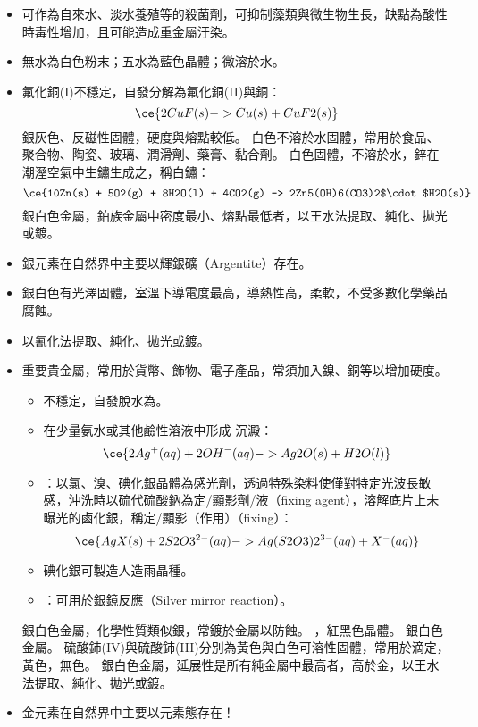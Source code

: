 \documentclass[a4paper,12pt]{report}
\begin{document}
\begin{itemize}
\begin{itemize}
\item 可作為自來水、淡水養殖等的殺菌劑，可抑制藻類與微生物生長，缺點為酸性時毒性增加，且可能造成重金屬汙染。
\eit
{}
\bit
\item 無水為白色粉末；五水為藍色晶體；微溶於水。
\item 氟化銅(I)不穩定，自發分解為氟化銅(II)與銅：
\[\ce{2CuF(s) -> Cu(s) + CuF2(s)}\]
\eit
{}
銀灰色、反磁性固體，硬度與熔點較低。
白色不溶於水固體，常用於食品、聚合物、陶瓷、玻璃、潤滑劑、藥膏、黏合劑。
白色固體，不溶於水，鋅在潮溼空氣中生鏽生成之，稱白鏽：
\[\ce{10Zn(s) + 5O2(g) + 8H2O(l) + 4CO2(g) -> 2Zn5(OH)6(CO3)2$\cdot$H2O(s)}\]
銀白色金屬，鉑族金屬中密度最小、熔點最低者，以王水法提取、純化、拋光或鍍。
\bit
\item 銀元素在自然界中主要以輝銀礦（Argentite）存在。
\item 銀白色有光澤固體，室溫下導電度最高，導熱性高，柔軟，不受多數化學藥品腐蝕。
\item 以氰化法提取、純化、拋光或鍍。
\item 重要貴金屬，常用於貨幣、飾物、電子產品，常須加入鎳、銅等以增加硬度。
\eit
{}
\begin{itemize}
\item {}不穩定，自發脫水為。
\item 在少量氨水或其他鹼性溶液中形成 沉澱：
\[\ce{2Ag^+(aq) + 2OH^-(aq) -> Ag2O(s) + H2O(l)}\]
\item {}：以氯、溴、碘化銀晶體為感光劑，透過特殊染料使僅對特定光波長敏感，沖洗時以硫代硫酸鈉為定/顯影劑/液（fixing agent），溶解底片上未曝光的鹵化銀，稱定/顯影（作用）（fixing）：
\[\ce{AgX(s) + 2S2O3^{2-}(aq) -> Ag(S2O3)2^{3-}(aq) + X^-(aq)}\]
\item 碘化銀可製造人造雨晶種。
\item {}：可用於銀鏡反應（Silver mirror reaction）。
\end{itemize}
銀白色金屬，化學性質類似銀，常鍍於金屬以防蝕。
，紅黑色晶體。
銀白色金屬。
硫酸鈰(IV)與硫酸鈰(III)分別為黃色與白色可溶性固體，常用於滴定，黃色，無色。
銀白色金屬，延展性是所有純金屬中最高者，高於金，以王水法提取、純化、拋光或鍍。
\bit
\item 金元素在自然界中主要以元素態存在！

\end{itemize}
\end{itemize}
\end{document}
